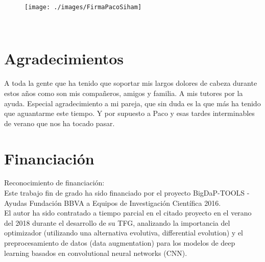 \documentclass['../proyecto.tex']{memoir}
\begin{document}
\vspace{2cm}

\begin{figure}[H]
	
	\centering
	\texttt{[image: ./images/FirmaPacoSiham]}
		
\end{figure}



\noindent \textbf{\MainProf \ \ \ \ \ \ \ \ \ \ \ \ \ \ \ \ \ \ \ \ \ \ \ \ \ \ \ \ \ \ \ \ \ \ \ \ \ \ \ \ \ \SecondProf}

\chapter*{Agradecimientos}
\thispagestyle{empty}

\vspace{1cm}

A toda la gente que ha tenido que soportar mis largos dolores de cabeza durante estos años como son mis compañeros, amigos y familia. A mis tutores por la ayuda. Especial agradecimiento a mi pareja, que sin duda es la que más ha tenido que aguantarme este tiempo. Y por supuesto a Paco y esas tardes interminables de verano que nos ha tocado pasar.

\newpage

\chapter*{Financiación}
\thispagestyle{empty}

\vspace{1cm}

Reconocimiento de financiación: \\

Este trabajo fin de grado ha sido financiado por el proyecto  BigDaP-TOOLS - Ayudas Fundación BBVA a Equipos de Investigación
Científica 2016.  \\

El autor ha sido contratado a tiempo parcial en el citado proyecto en el verano del 2018 durante el desarrollo de su TFG,  analizando la importancia del optimizador (utilizando una alternativa evolutiva, differential evolution)  y el preprocesamiento de datos (data augmentation) para los modelos de deep learning basados en convolutional neural networks (CNN).  

\newpage
\end{document}
